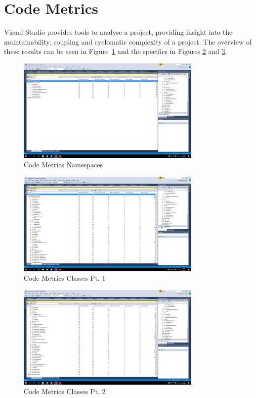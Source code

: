 \documentclass[a4paper, oneside, 11pt]{report}
\begin{document}
\section{Code Metrics}
Visual Studio provides tools to analyse a project, providing insight into the maintainability, coupling and cyclomatic complexity of a project. The overview of these results can be seen in Figure~\ref{metrics-1} and the specifics in Figures \ref{metrics-2} and \ref{metrics-3}.

\begin{figure}[H]
	\caption{Code Metrics Namespaces}\label{metrics-1}
	\centering
	\includegraphics[width=0.8\textwidth]{metrics-1}
\end{figure}

\begin{figure}[H]
\caption{Code Metrics Classes Pt. 1}\label{metrics-2}
\centering
\includegraphics[width=0.8\textwidth]{metrics-2}
\end{figure}

\begin{figure}[H]
	\caption{Code Metrics Classes Pt. 2}\label{metrics-3}
	\centering
	\includegraphics[width=0.8\textwidth]{metrics-3}
\end{figure}
\end{document}
